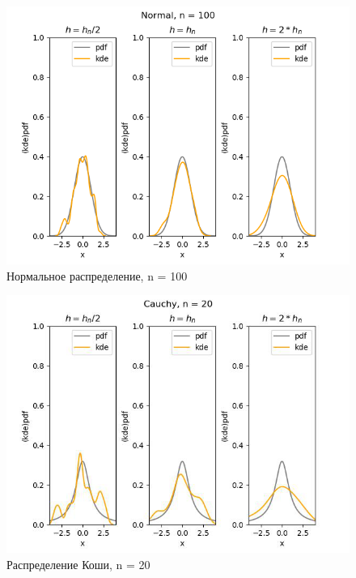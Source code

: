 \documentclass[../body.tex]{subfiles}
\begin{document}
\begin{figure}[H]
	\centering
	\includegraphics[width=\textwidth, height =0.4\textheight]{img/NormalKDE n = 100.png}
	\caption{Нормальное распределение, n = 100}
	\label{fig:normal_kde_100}
\end{figure}

\begin{figure}[H]
	\centering
	\includegraphics[width=\textwidth, height =0.4\textheight]{img/CauchyKDE n = 20.png}
	\caption{Распределение Коши, n = 20}
	\label{fig:cauchy_kde_20}
\end{figure}
\end{document}
